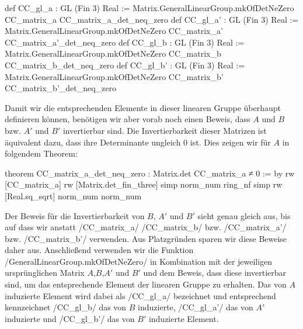 \documentclass[10pt]{article}
\begin{document}
\begin{leancode}
def CC_gl_a   : GL (Fin 3) Real := 
               Matrix.GeneralLinearGroup.mkOfDetNeZero CC_matrix_a CC_matrix_a_det_neq_zero
def CC_gl_a'  : GL (Fin 3) Real := 
               Matrix.GeneralLinearGroup.mkOfDetNeZero CC_matrix_a' CC_matrix_a'_det_neq_zero
def CC_gl_b   : GL (Fin 3) Real := 
               Matrix.GeneralLinearGroup.mkOfDetNeZero CC_matrix_b CC_matrix_b_det_neq_zero
def CC_gl_b'  : GL (Fin 3) Real := 
               Matrix.GeneralLinearGroup.mkOfDetNeZero CC_matrix_b' CC_matrix_b'_det_neq_zero
\end{leancode}
Damit wir die entsprechenden Elemente in dieser linearen Gruppe überhaupt definieren können, benötigen wir aber vorab noch einen Beweis, dass $A$ und $B$ bzw. $A'$ und $B'$ invertierbar sind. Die Invertierbarkeit dieser Matrizen ist äquivalent dazu, dass ihre Determinante ungleich $0$ ist. Dies zeigen wir für $A$ in folgendem Theorem:
\begin{leancode}
theorem CC_matrix_a_det_neq_zero : Matrix.det CC_matrix_a ≠ 0 := by
  rw [CC_matrix_a]
  rw [Matrix.det_fin_three]
  simp
  norm_num
  ring_nf
  simp
  rw [Real.sq_sqrt]
  norm_num
  norm_num
\end{leancode}
\noindent Der Beweis für die Invertierbarkeit von $B$, $A'$ und $B'$ sieht genau gleich aus, bis auf dass wir anstatt \lean/CC_matrix_a/ \lean/CC_matrix_b/ bzw. \lean/CC_matrix_a'/ bzw. \lean/CC_matrix_b'/ verwenden. Aus Platzgründen sparen wir diese Beweise daher aus.
\noindent Anschließend verwenden wir die Funktion  \lean/GeneralLinearGroup.mkOfDetNeZero/ in Kombination mit der jeweiligen ursprünglichen Matrix $A$,$B$,$A'$ und $B'$ und dem Beweis, dass diese invertierbar sind, um das entsprechende Element der linearen Gruppe zu erhalten. Das von $A$ induzierte Element wird dabei als \lean/CC_gl_a/ bezeichnet und entsprechend kennzeichnet \lean/CC_gl_b/ das von $B$ induzierte, \lean/CC_gl_a'/ das von $A'$ induzierte und \lean/CC_gl_b'/ das von $B'$ induzierte Element.
\end{document}

